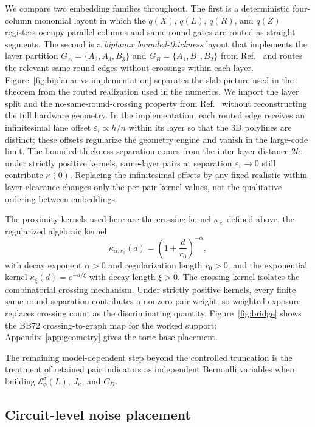 \documentclass[
aps,
prx,
10pt,
twocolumn,
groupedaddress,
longbibliography,
nofootinbib,
floatfix
]{revtex4-2}
\theoremstyle{definition}
\newcommand{\Ew}{\mathcal{E}}
\begin{document}
We compare two embedding families throughout. The first is a deterministic four-column monomial layout in which the $q(X)$, $q(L)$, $q(R)$, and $q(Z)$ registers occupy parallel columns and same-round gates are routed as straight segments. The second is a \emph{biplanar bounded-thickness} layout that implements the layer partition $G_A=\{A_2,A_3,B_3\}$ and $G_B=\{A_1,B_1,B_2\}$ from Ref.~ and routes the relevant same-round edges without crossings within each layer. Figure~\ref{fig:biplanar-vs-implementation} separates the slab picture used in the theorem from the routed realization used in the numerics. We import the layer split and the no-same-round-crossing property from Ref.~ without reconstructing the full hardware geometry. In the implementation, each routed edge receives an infinitesimal lane offset $\varepsilon_i\propto h/n$ within its layer so that the 3D polylines are distinct; these offsets regularize the geometry engine and vanish in the large-code limit. The bounded-thickness separation comes from the inter-layer distance $2h$: under strictly positive kernels, same-layer pairs at separation $\varepsilon_i\to 0$ still contribute $\kappa(0)$. Replacing the infinitesimal offsets by any fixed realistic within-layer clearance changes only the per-pair kernel values, not the qualitative ordering between embeddings.

The proximity kernels used here are the crossing kernel $\kappa_{\times}$ defined above, the regularized algebraic kernel
\begin{equation}
\kappa_{\alpha,r_0}(d)=\left(1+\frac{d}{r_0}\right)^{-\alpha},
\label{eq:powerlaw}
\end{equation}
with decay exponent $\alpha>0$ and regularization length $r_0>0$, and the exponential kernel $\kappa_{\xi}(d)=e^{-d/\xi}$ with decay length $\xi>0$. The crossing kernel isolates the combinatorial crossing mechanism. Under strictly positive kernels, every finite same-round separation contributes a nonzero pair weight, so weighted exposure replaces crossing count as the discriminating quantity. Figure~\ref{fig:bridge} shows the BB72 crossing-to-graph map for the worked support; Appendix~\ref{app:geometry} gives the toric-base placement.

The remaining model-dependent step beyond the controlled truncation is the treatment of retained pair indicators as independent Bernoulli variables when building $\Ew_\phi^\sigma(L)$, $J_\kappa$, and $C_D$.

\subsection{Circuit-level noise placement}
\label{sec:syndrome}
\end{document}
